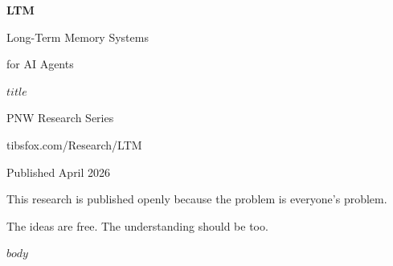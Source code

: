 \documentclass[11pt,a4paper]{article}
\begin{document}
\begin{titlepage}
\centering
\vspace*{3cm}
{\Huge\bfseries\sffamily\color{ltmaccent} LTM\par}
\vspace{0.5cm}
{\LARGE\sffamily Long-Term Memory Systems\par for AI Agents\par}
\vspace{1cm}
{\Large\sffamily\color{ltmmem} $title$\par}
\vspace{2cm}
{\large\sffamily PNW Research Series\par}
{\normalsize\sffamily tibsfox.com/Research/LTM\par}
\vspace{1cm}
{\normalsize\sffamily\color{ltmmuted} Published April 2026\par}
\vfill
{\small\sffamily\color{ltmmuted} This research is published openly because the problem is everyone's problem.\par
The ideas are free. The understanding should be too.\par}
\end{titlepage}

$body$
\end{document}
